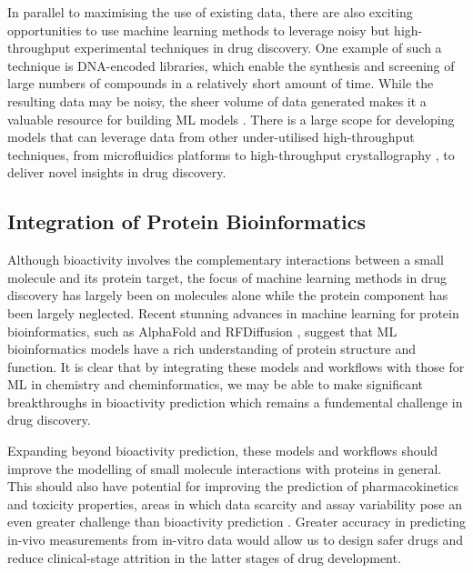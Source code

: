 In parallel to maximising the use of existing data, there are also exciting opportunities to use machine learning methods to leverage noisy but high-throughput experimental techniques in drug discovery. One example of such a technique is DNA-encoded libraries, which enable the synthesis and screening of large numbers of compounds in a relatively short amount of time. While the resulting data may be noisy, the sheer volume of data generated makes it a valuable resource for building ML models \cite{McCloskey2020DNALibrary, Blay20221DELTox, Lim2022DELCountML}. There is a large scope for developing models that can leverage data from other under-utilised high-throughput techniques, from microfluidics platforms \cite{Dittrich2006microfluidics, Skardal2016chip} to high-throughput crystallography \cite{Blundell2002HighThroughputCrystallography, Schiebel2016HighThroughput}, to deliver novel insights in drug discovery.

\subsection{Integration of Protein Bioinformatics}
Although bioactivity involves the complementary interactions between a small molecule and its protein target, the focus of machine learning methods in drug discovery has largely been on molecules alone while the protein component has been largely neglected. Recent stunning advances in machine learning for protein bioinformatics, such as AlphaFold \cite{Jumper2021AlphaFold} and RFDiffusion \cite{Watson2022RfDiffusion}, suggest that ML bioinformatics models have a rich understanding of protein structure and function. It is clear that by integrating these models and workflows with those for ML in chemistry and cheminformatics, we may be able to make significant breakthroughs in bioactivity prediction which remains a fundemental challenge in drug discovery.

Expanding beyond bioactivity prediction, these models and workflows should improve the modelling of small molecule interactions with proteins in general. This should also have potential for improving the prediction of pharmacokinetics and toxicity properties, areas in which data scarcity and assay variability pose an even greater challenge than bioactivity prediction \cite{Bhhatarai2019ADMETox, Wenzel2019ADMETox,Goller2020BayerADMET, Obrezanova2022InVivo}. Greater accuracy in predicting in-vivo measurements from in-vitro data would allow us to design safer drugs and reduce clinical-stage attrition in the latter stages of drug development.

